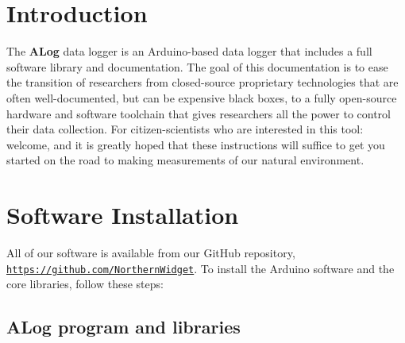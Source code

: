 \hypertarget{index_intro_sec}{}\section{Introduction}\label{index_intro_sec}
The {\bfseries A\+Log} data logger is an Arduino-\/based data logger that includes a full software library and documentation. The goal of this documentation is to ease the transition of researchers from closed-\/source proprietary technologies that are often well-\/documented, but can be expensive black boxes, to a fully open-\/source hardware and software toolchain that gives researchers all the power to control their data collection. For citizen-\/scientists who are interested in this tool\+: welcome, and it is greatly hoped that these instructions will suffice to get you started on the road to making measurements of our natural environment.\hypertarget{index_software}{}\section{Software Installation}\label{index_software}
All of our software is available from our Git\+Hub repository, \href{https://github.com/NorthernWidget}{\tt https\+://github.\+com/\+Northern\+Widget}. To install the Arduino software and the core libraries, follow these steps\+:\hypertarget{index_libraries}{}\subsection{A\+Log program and libraries}\label{index_libraries}


